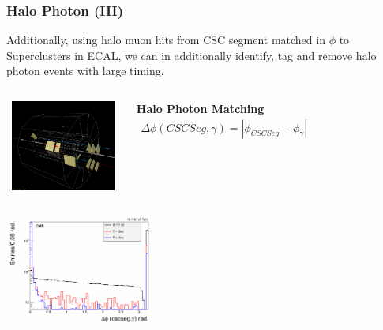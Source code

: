 \documentclass{beamer}
\begin{document}
\begin{frame}
\frametitle{Halo Photon (III)}
 \begin{minipage}[t]{\linewidth}
  Additionally, using halo muon hits from CSC segment matched in $\phi$ to Superclusters in ECAL, we can in additionally identify, tag and remove halo photon events with large timing.
    \begin{columns}
         \mbox{
            \includegraphics[height=3cm,width=0.35\paperwidth]{THESISPLOTS/CSC_Beam-Halo-Muon_ev62604_836.png}
          }
        \begin{varblock}[4.0cm]{\textbf{Halo Photon Matching}}
          \begin{eqnarray*}
             \Delta \phi (CSC Seg, \gamma) = | \phi_{CSC Seg} - \phi_{\gamma} |
           \end{eqnarray*}
        \end{varblock}     
    \end{columns}
  \end{minipage}
  \begin{minipage}[t]{\linewidth}
  \includegraphics[height=3.6cm,width=0.80\paperwidth]{THESISPLOTS/cs_side_cscdPhi.png} 
   \end{minipage}
\end{frame}
\end{document}
